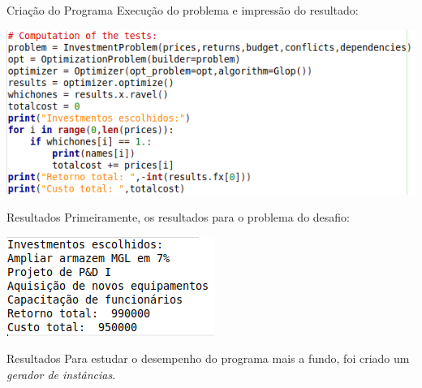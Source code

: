 \documentclass{beamer}
\begin{document}
\begin{frame}{Criação do Programa}
Execução do problema e impressão do resultado:
\begin{center}
\includegraphics[scale=0.4]{CONCLUSION_FOR_PRESENTATION.png}
\end{center}
\end{frame}

\begin{frame}{Resultados}
Primeiramente, os resultados para o problema do desafio:\pause
\begin{center}
\includegraphics[scale=0.8]{RESULT_FOR_PRESENTATION.png}
\end{center}
\end{frame}

\begin{frame}{Resultados}
Para estudar o desempenho do programa mais a fundo, foi criado um
\emph{gerador de instâncias}.
\end{frame}
\end{document}
